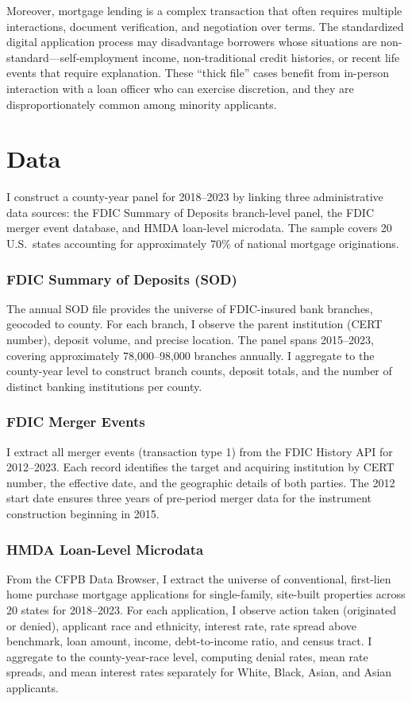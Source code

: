 \documentclass[12pt]{article}
\begin{document}
Moreover, mortgage lending is a complex transaction that often requires multiple interactions, document verification, and negotiation over terms. The standardized digital application process may disadvantage borrowers whose situations are non-standard---self-employment income, non-traditional credit histories, or recent life events that require explanation. These ``thick file'' cases benefit from in-person interaction with a loan officer who can exercise discretion, and they are disproportionately common among minority applicants.


\section{Data}
\label{sec:data}

I construct a county-year panel for 2018--2023 by linking three administrative data sources: the FDIC Summary of Deposits branch-level panel, the FDIC merger event database, and HMDA loan-level microdata. The sample covers 20 U.S.\ states accounting for approximately 70\% of national mortgage originations.

\subsubsection*{FDIC Summary of Deposits (SOD)} The annual SOD file provides the universe of FDIC-insured bank branches, geocoded to county. For each branch, I observe the parent institution (CERT number), deposit volume, and precise location. The panel spans 2015--2023, covering approximately 78,000--98,000 branches annually. I aggregate to the county-year level to construct branch counts, deposit totals, and the number of distinct banking institutions per county.

\subsubsection*{FDIC Merger Events} I extract all merger events (transaction type 1) from the FDIC History API for 2012--2023. Each record identifies the target and acquiring institution by CERT number, the effective date, and the geographic details of both parties. The 2012 start date ensures three years of pre-period merger data for the instrument construction beginning in 2015.

\subsubsection*{HMDA Loan-Level Microdata} From the CFPB Data Browser, I extract the universe of conventional, first-lien home purchase mortgage applications for single-family, site-built properties across 20 states for 2018--2023. For each application, I observe action taken (originated or denied), applicant race and ethnicity, interest rate, rate spread above benchmark, loan amount, income, debt-to-income ratio, and census tract. I aggregate to the county-year-race level, computing denial rates, mean rate spreads, and mean interest rates separately for White, Black, Asian, and Asian applicants.
\end{document}
